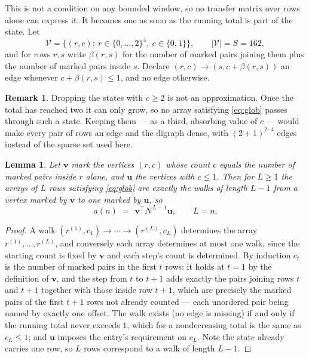 \documentclass[11pt,a4paper]{article}
\theoremstyle{plain}
\newtheorem{lemma}[theorem]{Lemma}
\theoremstyle{definition}
\newtheorem{remark}[theorem]{Remark}
\begin{document}
This is not a condition on any bounded window, so no transfer matrix over rows alone can
express it. It becomes one as soon as the running total is part of the state. Let
\[
\mathcal V=\bigl\{(r,c):\ r\in\{0,\dots,2\}^{4},\ c\in\{0,1\}\bigr\},
\qquad |\mathcal V|=S=162,
\]
and for rows $r,s$ write $\beta(r,s)$ for the number of marked pairs joining them plus the
number of marked pairs inside $s$. Declare $(r,c)\to(s,c+\beta(r,s))$ an edge whenever
$c+\beta(r,s)\le1$, and no edge otherwise.

\begin{remark}
Dropping the states with $c\ge2$ is not an approximation. Once the total has reached two it
can only grow, so no array satisfying \eqref{eq:glob} passes through such a state. Keeping
them --- as a third, absorbing value of $c$ --- would make every pair of rows an edge and
the digraph dense, with $(2+1)^{2\cdot4}$ edges instead of the sparse set used here.
\end{remark}

\begin{lemma}\label{lem:walk}
Let $\mathbf{v}$ mark the vertices $(r,c)$ whose count $c$ equals the number of marked pairs
inside $r$ alone, and $\mathbf{u}$ the vertices with $c\le1$. Then for $L\ge1$ the arrays
of $L$ rows satisfying \eqref{eq:glob} are exactly the walks of length $L-1$ from a
vertex marked by $\mathbf{v}$ to one marked by $\mathbf{u}$, so
\[
a(n)\;=\;\,\mathbf{v}^{\!\top}N^{\,L-1}\mathbf{u},\qquad L=n .
\]
\end{lemma}

\begin{proof}
A walk $(r^{(1)},c_1)\to\cdots\to(r^{(L)},c_L)$ determines the array
$r^{(1)},\dots,r^{(L)}$, and conversely each array determines at most one walk, since the
starting count is fixed by $\mathbf{v}$ and each step's count is determined. By induction
$c_t$ is the number of marked pairs in the first $t$ rows: it holds at $t=1$ by the
definition of $\mathbf{v}$, and the step from $t$ to $t+1$ adds exactly the pairs joining
rows $t$ and $t+1$ together with those inside row $t+1$, which are precisely the marked
pairs of the first $t+1$ rows not already counted --- each unordered pair being named by
exactly one offset. The walk exists (no edge is missing) if and only if the running total
never exceeds $1$, which for a nondecreasing total is the same as $c_L\le1$; and
$\mathbf{u}$ imposes the entry's requirement on $c_L$. Note the state already carries one
row, so $L$ rows correspond to a walk of length $L-1$.
\end{proof}
\end{document}
